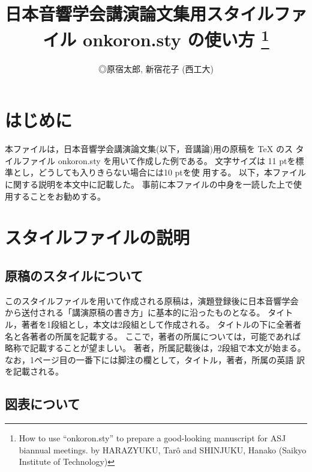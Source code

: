 \documentclass[10pt,twocolumn]{jarticle} %
\title{日本音響学会講演論文集用スタイルファイル onkoron.sty の使い方
\thanks{How to use ``onkoron.sty'' to prepare a good-looking
manuscript for ASJ biannual meetings. by HARAZYUKU, Tar\^o and 
SHINJUKU, Hanako (Saikyo Institute of Technology)}
}
\author{◎原宿太郎, 新宿花子 (西工大)}
\begin{document}
\maketitle   

\section{はじめに}

本ファイルは，日本音響学会講演論文集(以下，音講論)用の原稿を TeX のス
タイルファイル onkoron.sty を用いて作成した例である。
文字サイズは 11 ptを標準とし，どうしても入りきらない場合には10 ptを使
用する。
以下，本ファイルに関する説明を本文中に記載した。
事前に本ファイルの中身を一読した上で使用することをお勧めする。

\section{スタイルファイルの説明}

\subsection{原稿のスタイルについて}

このスタイルファイルを用いて作成される原稿は，演題登録後に日本音響学会
から送付される「講演原稿の書き方」に基本的に沿ったものとなる。
タイトル，著者を1段組とし，本文は2段組として作成される。
タイトルの下に全著者名と各著者の所属を記載する。
ここで，著者の所属については，可能であれば略称で記載することが望ましい。
著者，所属記載後は，2段組で本文が始まる。
なお，1ページ目の一番下には脚注の欄として，タイトル，著者，所属の英語
訳を記載される。

\subsection{図表について}
\end{document}
